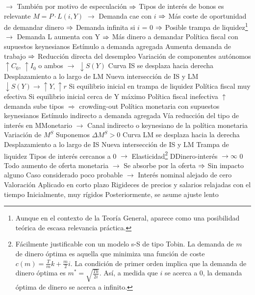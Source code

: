 \documentclass{nuevotema}
\begin{document}
\begin{esquemal}
				\4[] $\to$ También por motivo de especulación
				\4[] $\Rightarrow$ Tipos de interés de bonos es relevante
				\4[] $M = P \cdot L(i, Y)$
				\4[] $\to$ Demanda cae con $i$
				\4[] $\Rightarrow$ Más coste de oportunidad de demandar dinero
				\4[] $\Rightarrow$ Demanda infinita si $i$ = 0
				\4[] $\Rightarrow$ Posible trampa de liquidez\footnote{Aunque en el contexto de la Teoría General, aparece como una posibilidad teórica de escasa relevancia práctica.}
				\4[] $\to$ Demanda L aumenta con Y
				\4[] $\Rightarrow$ Más dinero a demandar
			\3 Política fiscal con supuestos keynesianos
				\4 Estímulo a demanda agregada
				\4[] Aumenta demanda de trabajo
				\4[] $\Rightarrow$ Reducción directa del desempleo
				\4 Variación de componentes autónomos
				\4[] $\uparrow C_0$, $\uparrow I_0$ o ambos $\to$ $\downarrow S(Y)$
				\4[1] Curva IS se desplaza hacia derecha
				\4[2] Desplazamiento a lo largo de LM
				\4[3] Nueva intersección de IS y LM
				\4[$\Rightarrow$] $\downarrow S(Y) \to \uparrow Y, \uparrow r$
				\4[] 
				\4 Si equilibrio inicial en trampa de liquidez
				\4[] Política fiscal muy efectiva
				\4 Si equilibrio inicial cerca de Y máximo
				\4[] Política fiscal inefectiva
				\4[] $\uparrow$ demanda sube tipos $\Rightarrow$ crowding-out
			\3 Política monetaria con supuestos keynesianos
				\4 Estímulo indirecto a demanda agregada
				\4[] Vía reducción del tipo de interés en MMonetario
				\4[] $\to$ Canal indirecto o keynesiano de la política monetaria
				\4 Variación de $M^S$
				\4 Suponemos $\Delta M^S > 0$
				\4[1] Curva LM se desplaza hacia la derecha
				\4[2] Desplazamiento a lo largo de IS
				\4[3] Nueva intersección de IS y LM
				\4[] 
				\4 Trampa de liquidez
				\4[] Tipos de interés cercanos a 0
				\4[] $\to$ Elasticidad\footnote{Fácilmente justificable con un modelo s-S de tipo Tobin. La demanda de $m$ de dinero óptima es aquella que minimiza una función de coste $c(m) = \frac{T}{m} k + \frac{m}{2} i$. La condición de primer orden implica que la demanda de dinero óptima es $m^* = \sqrt{\frac{Tk}{2i}}$. Así, a medida que $i$ se acerca a 0, la demanda óptima de dinero se acerca a infinito.} DDinero-interés $\to \infty$ 0
				\4[] Todo aumento de oferta monetaria
				\4[] $\to$ Se absorbe por la oferta
				\4[] $\Rightarrow$ Sin impacto alguno
				\4[] Caso considerado poco probable
				\4[] $\to$ Interés nominal alejado de cero
			\3 Valoración
				\4 Aplicado en corto plazo
				\4 Rigideces de precios y salarios relajadas con el tiempo
				\4[] Inicialmente, muy rígidos
				\4[] Posteriormente, se asume ajuste lento

\end{esquemal}
\end{document}

